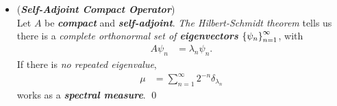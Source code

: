 \documentclass[11pt]{article}
\begin{document}
\begin{itemize}
\begin{example}
Suppose first that \emph{the eigenvalues are \textbf{distinct}}. The \emph{spectral measure} is just \emph{the sum of \textbf{Dirac measures}}, 
\begin{align}
\mu &= \sum_{i=1}^{n}\delta_{\lambda_i}, \label{eqn: spectral_measure_finite_dim}
\end{align}
and $L^2(\bR,\mu)$ is just $\bC^{n}$ since $f \in L^2$ is \emph{\textbf{determined}} by 
\begin{align*}
 \paren{f(\lambda_1) \xdotx{,} f(\lambda_n)}.
\end{align*}
Clearly, the function $\lambda f$ corresponds to the $n$-tuple $\paren{\lambda_1 f(\lambda_1) \xdotx{,} \lambda_n f(\lambda_n)}$, 
so $A$ is \emph{\textbf{multiplication}} by $\lambda$ on $L^2(\bR,\mu)$. 

If we take 
\begin{align*}
\bar{\mu} &= \sum_{i=1}^{n}a_i \delta_{\lambda_i},
\end{align*} with $a_1 \xdotx{,} a_n >0$, $A$ \emph{can also be represented as \textbf{multiplication} by $\lambda$ on $L^2(\bR, \bar{\mu})$}. 
Thus, we explicitly see \emph{the \textbf{nonuniqueness} of the \textbf{measure}} in this case. 

We can also see when \emph{\textbf{more than one measure is needed}}: 
\emph{one can represent a finite-dimensional self-adjoint operator as multiplication on $L^2(\bR,\mu)$ with \textbf{only one measure} \textbf{if and only if} $A$ has \textbf{no repeated eigenvalues}}. \qed
\end{example}

\item \begin{example}  (\emph{\textbf{Self-Adjoint Compact Operator}})\\
Let $A$ be \textbf{\emph{compact}} and \textbf{\emph{self-adjoint}}. \emph{The Hilbert-Schmidt theorem} tells us there is a \emph{complete orthonormal set of \textbf{eigenvectors}} $\left\{\psi_n\right\}_{n=1}^{\infty}$, with
\begin{align*}
A \psi_n &= \lambda_n \psi_n.
\end{align*}
If there is \emph{no repeated eigenvalue}, 
\begin{align}
\mu &= \sum_{n=1}^{\infty}2^{-n}\delta_{\lambda_n}  \label{eqn: spectral_measure_compact}
\end{align}
works as a \emph{\textbf{spectral measure}}. \qed
\end{example}


\end{itemize}
\end{document}
